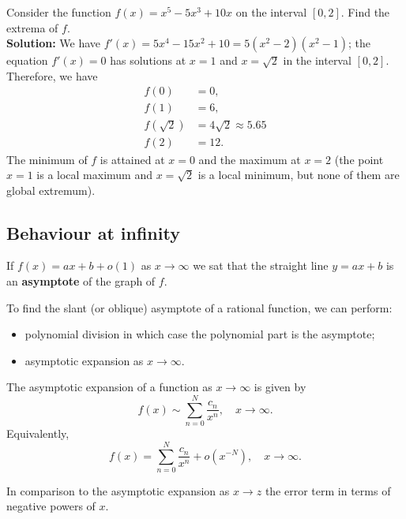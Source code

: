 \documentclass[12pt, a4paper]{article}
\begin{document}
\begin{example}
    Consider the function \(f(x)=x^5-5x^3+10x\) on the interval \([0,2]\). Find the extrema of \(f\). \\
    \textbf{Solution:} We have \(f'(x)=5x^4-15x^2+10 = 5(x^2-2)(x^2-1)\); the equation \(f'(x)=0\) has solutions at \(x=1\) and \(x=\sqrt{2}\) in the interval \([0,2]\). Therefore, we have 
    \[\begin{aligned}
        f(0) &= 0, \\
        f(1) &= 6, \\
        f(\sqrt{2}) &= 4\sqrt{2} \approx 5.65 \\
        f(2) &=12.
    \end{aligned}\]
    The minimum of \(f\) is attained at \(x=0\) and the maximum at \(x=2\) (the point \(x=1\) is a local maximum and \(x=\sqrt{2}\) is a local minimum, but none of them are global extremum).
\end{example}

\subsection{Behaviour at infinity}

\begin{definition}
    If \(f(x)=ax+b +o(1)\) as \(x\to \infty\) we sat that the straight line \(y=ax+b\) is an \textbf{asymptote} of the graph of \(f\).
\end{definition}

\begin{mdremark}
    To find the slant (or oblique) asymptote of a rational function, we can perform:
    \begin{itemize}
        \item polynomial division in which case the polynomial part is the asymptote;
        \item asymptotic expansion as \(x\to \infty\).
    \end{itemize}
\end{mdremark}

\begin{theorem}
    The asymptotic expansion of a function as \(x\to \infty\) is given by 
    \[f(x) \sim \sum_{n=0}^N \frac{c_n}{x^n}, \quad x\to \infty.\]
    Equivalently,
    \[f(x) = \sum_{n=0}^N \frac{c_n}{x^n}+o(x^{-N}), \quad x\to \infty.\]
\end{theorem}

\begin{mdnote}
    In comparison to the asymptotic expansion as \(x\to z\) the error term in terms of negative powers of \(x\).
\end{mdnote}
\end{document}
